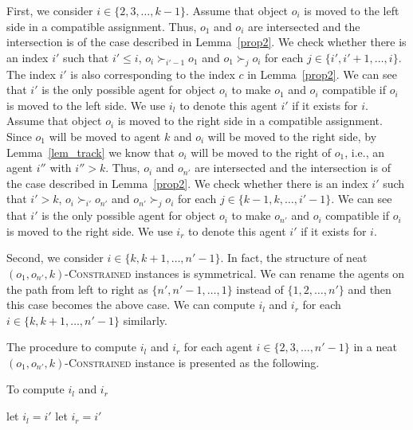 First, we consider $i\in\{2,3,\dots, k-1\}$. Assume that object $o_i$ is moved to the left side in a compatible assignment.
Thus, $o_1$ and $o_i$ are intersected and the intersection is of the case described in Lemma~\ref{prop2}.
We check whether there is an index $i'$ such that $i'\leq i$,  $o_i\succ_{i'-1}o_1$ and  $o_1\succ_j o_i$ for each $j \in \{i', i'+1, \dots, i\}$. The index $i'$ is also corresponding to the index $c$ in Lemma~\ref{prop2}.
We can see that $i'$ is the only possible agent for object $o_i$ to make $o_1$ and $o_i$ compatible if $o_i$ is moved to the left side.
We use $i_l$ to denote this agent $i'$ if it exists for $i$.
Assume that object $o_i$ is moved to the right side in a compatible assignment.
Since $o_1$ will be moved to agent $k$ and $o_i$ will be moved to the right side, by Lemma~\ref{lem_track} we know that $o_i$ will be moved to the right of $o_1$, i.e., an agent $i''$ with $i''> k$. Thus,  $o_i$ and $o_{n'}$ are intersected and the intersection is of the case described in Lemma~\ref{prop2}.
We check whether there is an index $i'$ such that $i'> k$,  $o_i\succ_{i'}o_{n'}$ and $o_{n'}\succ_j o_i$ for each $j \in \{k-1, k, \dots, i'-1\}$.
We can see that $i'$ is the only possible agent for object $o_i$ to make $o_{n'}$ and $o_i$ compatible if $o_i$ is moved to the right side.
We use $i_r$ to denote this agent $i'$ if it exists for $i$.


Second, we consider $i\in\{k,k+1,\dots, n'-1\}$. In fact, the structure of neat $(o_1,o_{n'},k)$-\textsc{Constrained} instances is symmetrical. We can rename the agents on the path from left to
right as $\{n', n'-1, \dots, 1\}$ instead of $\{1, 2, \dots, n'\}$ and then this case becomes the above case. We can compute $i_l$ and $i_r$ for each $i\in\{k,k+1,\dots, n'-1\}$ similarly.


The procedure to compute $i_l$ and $i_r$ for each agent $i\in\{2,3,\dots, n'-1\}$ in a neat $(o_1,o_{n'},k)$-\textsc{Constrained} instance
is presented as the following.


\begin{algorithm}[h!]
    \caption{To compute $i_l$ and $i_r$}
    \label{iril}
    {
      {let $i_l= i'$\;}
      {let $i_r= i'$\;}
    }
\end{algorithm}




